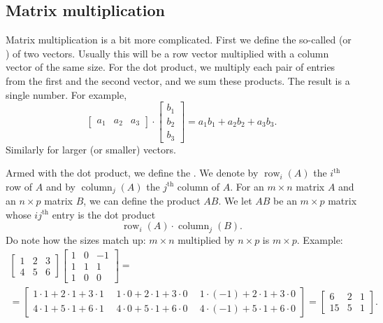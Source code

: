 \subsection{Matrix multiplication}

Matrix multiplication is a bit more complicated.
First we define the so-called
\emph{} (or \emph{}) of two vectors.
Usually this will be a row vector multiplied
with a column vector of the same size.  For the dot product,
we multiply
each pair of entries from the first and the second vector, and we sum these
products.  The result is a single number.
For example,
\begin{equation*}
\begin{bmatrix}
a_1 & a_2 & a_3
\end{bmatrix}
\cdot
\begin{bmatrix}
b_1 \\
b_2 \\
b_3
\end{bmatrix}
= a_1 b_1 + a_2 b_2 + a_3 b_3 .
\end{equation*}
Similarly for larger (or smaller) vectors.

Armed with the dot product, we define the
\emph{}.
We denote by $\operatorname{row}_i(A)$ the $i^{\text{th}}$ row
of $A$ and by
$\operatorname{column}_j(A)$ the $j^{\text{th}}$ column of $A$.
For an $m \times n$ matrix $A$ and an $n \times p$ matrix $B$,
we can define the product $AB$.  We let $AB$ be an $m \times p$
matrix whose $ij^{\text{th}}$ entry is the dot product
\begin{equation*}
\operatorname{row}_i(A) \cdot
\operatorname{column}_j(B) .
\end{equation*}
Do note how the sizes match up: $m \times n$ multiplied by $n \times p$ is 
$m \times p$.  Example:
\begin{multline*}
\begin{bmatrix}
1 & 2 & 3 \\
4 & 5 & 6
\end{bmatrix}
\begin{bmatrix}
1 & 0 & -1 \\
1 & 1 & 1 \\
1 & 0 & 0
\end{bmatrix}
= \\ =
\begin{bmatrix}
1\cdot 1 + 2\cdot 1 + 3 \cdot 1 & ~~
1\cdot 0 + 2\cdot 1 + 3 \cdot 0 & ~~
1\cdot (-1) + 2\cdot 1 + 3 \cdot 0 \\
4\cdot 1 + 5\cdot 1 + 6 \cdot 1 & ~~
4\cdot 0 + 5\cdot 1 + 6 \cdot 0 & ~~
4\cdot (-1) + 5\cdot 1 + 6 \cdot 0
\end{bmatrix}
=
\begin{bmatrix}
6 & 2 & 1 \\
15 & 5 & 1
\end{bmatrix} .
\end{multline*}

